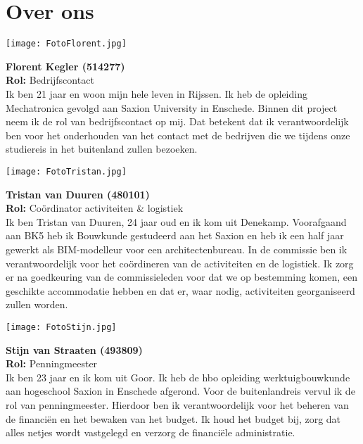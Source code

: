 \section*{Over ons}

\begin{minipage}{0.5\linewidth}
	\texttt{[image: FotoFlorent.jpg]}
\end{minipage}
\hfill
\vspace{1cm}
\begin{minipage}{\linewidth}
	\textbf{Florent Kegler (514277)} \\
	\textbf{Rol:} Bedrijfscontact \\
	Ik ben 21 jaar en woon mijn hele leven in Rijssen. Ik heb de opleiding Mechatronica gevolgd aan Saxion University in Enschede. Binnen dit project neem ik de rol van bedrijfscontact op mij. Dat betekent dat ik verantwoordelijk ben voor het onderhouden van het contact met de bedrijven die we tijdens onze studiereis in het buitenland zullen bezoeken.
\end{minipage}

\vspace{1cm}

\begin{minipage}{0.5\linewidth}
	\texttt{[image: FotoTristan.jpg]}
\end{minipage}
\hfill
\vspace{1cm}
\begin{minipage}{\linewidth}
	\textbf{Tristan van Duuren (480101)} \\
	\textbf{Rol: } Coördinator activiteiten \& logistiek \\
	Ik ben Tristan van Duuren, 24 jaar oud en ik kom uit Denekamp. Voorafgaand aan BK5 heb ik Bouwkunde gestudeerd aan het Saxion en heb ik een half jaar gewerkt als BIM-modelleur voor een architectenbureau. In de commissie ben ik verantwoordelijk voor het coördineren van de activiteiten en de logistiek. Ik zorg er na goedkeuring van de commissieleden voor dat we op bestemming komen, een geschikte accommodatie hebben en dat er, waar nodig, activiteiten georganiseerd zullen worden. 
\end{minipage}

\begin{minipage}{0.5\linewidth}
	\texttt{[image: FotoStijn.jpg]}
\end{minipage}
\hfill
\vspace{1cm}
\begin{minipage}{\linewidth}
	\textbf{Stijn van Straaten (493809)} \\
	\textbf{Rol: } Penningmeester \\
	Ik ben 23 jaar en ik kom uit Goor. Ik heb de hbo opleiding werktuigbouwkunde aan hogeschool Saxion in Enschede afgerond. Voor de buitenlandreis vervul ik de rol van penningmeester. Hierdoor ben ik verantwoordelijk voor het beheren van de financiën en het bewaken van het budget. Ik houd het budget bij, zorg dat alles netjes wordt vastgelegd en verzorg de financiële administratie.
\end{minipage}

